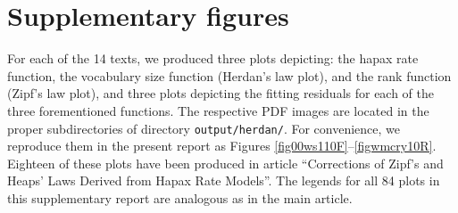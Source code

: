 \documentclass[a4paper,12pt]{article}
\begin{document}
\section{Supplementary figures}
\label{secFigures}

For each of the 14 texts, we produced three plots depicting: the hapax
rate function, the vocabulary size function (Herdan's law plot), and
the rank function (Zipf's law plot), and three plots depicting the
fitting residuals for each of the three forementioned functions.  The
respective PDF images are located in the proper subdirectories of
directory \verb}output/herdan/}. For convenience, we reproduce them in
the present report as Figures
\ref{fig00ws110F}--\ref{figwmcry10R}. Eighteen of these plots have
been produced in article ``Corrections of Zipf's and Heaps' Laws
Derived from Hapax Rate Models''. The legends for all 84 plots in this
supplementary report are analogous as in the main article.
\end{document}
